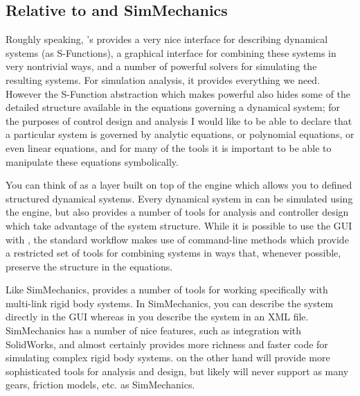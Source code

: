 \subsection{Relative to \simulink and SimMechanics}

Roughly speaking, \matlab's \simulink provides a very nice interface for describing dynamical systems (as S-Functions), a graphical interface for combining these systems in very nontrivial ways, and a number of powerful solvers for simulating the resulting systems.  For simulation analysis, it provides everything we need.   However the S-Function abstraction which makes \simulink powerful also hides some of the detailed structure available in the equations governing a dynamical system; for the purposes of control design and analysis I would like to be able to declare that a particular system is governed by analytic equations, or polynomial equations, or even linear equations, and for many of the tools it is important to be able to manipulate these equations symbolically.   

You can think of \drake as a layer built on top of the \simulink engine which allows you to defined structured dynamical systems.  Every dynamical system in \drake can be simulated using the \simulink engine, but \drake also provides a number of tools for analysis and controller design which take advantage of the system structure.  While it is possible to use the \simulink GUI with \drake, the standard workflow makes use of command-line methods which provide a restricted set of tools for combining systems in ways that, whenever possible, preserve the structure in the equations.  

Like SimMechanics, \drake provides a number of tools for working specifically with multi-link rigid body systems.  In SimMechanics, you can describe the system directly in the GUI whereas in \drake you describe the system in an XML file.  SimMechanics has a number of nice features, such as integration with SolidWorks, and almost certainly provides more richness and faster code for simulating complex rigid body systems.  \drake on the other hand will provide more sophisticated tools for analysis and design, but likely will never support as many gears, friction models, etc. as SimMechanics.  




